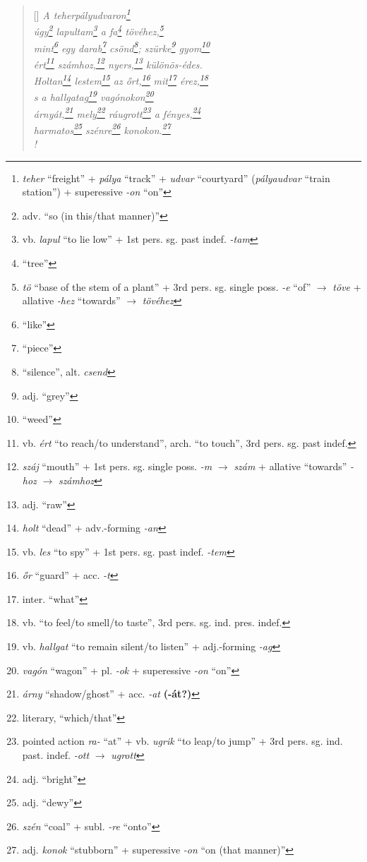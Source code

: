 \documentclass[a4paper,12pt,twoside,final]{book}
\begin{document}

\newpage

\settowidth{\versewidth}{Csak ami nincs, annak van bokra,}

\begin{verse}[\versewidth]
  \it
  A teherpályudvaron\footnote{\emph{teher} ``freight'' + \emph{pálya}
  ``track'' + \emph{udvar} ``courtyard'' (\emph{pályaudvar} ``train
  station'') + superessive \emph{-on} ``on''} \\
  úgy\footnote{adv. ``so (in this/that manner)''}
  lapultam\footnote{vb. \emph{lapul} ``to lie low''
  + 1st pers. sg. past indef. \emph{-tam}} a
  fa\footnote{``tree''} tövéhez,\footnote{\emph{tö} ``base of the stem
  of a plant'' + 3rd pers. sg. single poss. \emph{-e} ``of''
  $\rightarrow$ \emph{töve} + allative \emph{-hez} ``towards''
  $\rightarrow$ \emph{tövéhez}} \\
  mint\footnote{``like''} egy darab\footnote{``piece''}
  csönd\footnote{``silence'', alt. \emph{csend}};
  szürke\footnote{adj. ``grey''} gyom\footnote{``weed''} \\
  ért\footnote{vb. \emph{ért} ``to reach/to understand'',
  arch. ``to touch'', 3rd pers. sg. past indef.}
  számhoz,\footnote{\emph{száj} ``mouth'' + 1st
  pers. sg. single poss. \emph{-m} $\rightarrow$ \emph{szám} +
  allative ``towards'' \emph{-hoz} $\rightarrow$ \emph{számhoz}}
  nyers,\footnote{adj. ``raw''} különös-édes. \\
  Holtan\footnote{\emph{holt} ``dead'' + adv.-forming \emph{-an}}
  lestem\footnote{vb. \emph{les} ``to spy'' + 1st
  pers. sg. past indef. \emph{-tem}} az őrt,\footnote{\emph{őr} ``guard'' +
  acc. \emph{-t}} mit\footnote{inter. ``what''}
  érez,\footnote{vb. ``to feel/to smell/to taste'',
  3rd pers. sg. ind. pres. indef.} \\
  s a hallgatag\footnote{vb. \emph{hallgat} ``to remain silent/to
  listen'' + adj.-forming \emph{-ag}} vagónokon\footnote{\emph{vagón}
  ``wagon'' + pl. \emph{-ok} + superessive \emph{-on} ``on''} \\
  árnyát,\footnote{\emph{árny} ``shadow/ghost'' +
  acc. \emph{-at} \textbf{(-át?)}} mely\footnote{literary,
  ``which/that''} ráugrott\footnote{pointed action \emph{ra-} ``at'' +
  vb. \emph{ugrik} ``to leap/to jump'' + 3rd
  pers. sg. ind. past. indef. \emph{-ott} $\rightarrow$ \emph{ugrott}} a
  fényes,\footnote{adj. ``bright''} \\
  harmatos\footnote{adj. ``dewy''} szénre\footnote{\emph{szén}
  ``coal'' + subl. \emph{-re} ``onto''}
  konokon.\footnote{adj. \emph{konok} ``stubborn'' +
  superessive \emph{-on} ``on (that manner)''} \\!
\end{verse}
\end{document}
